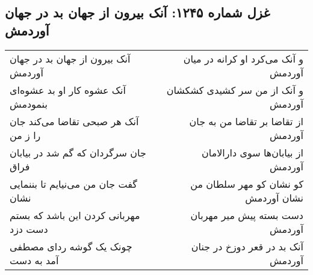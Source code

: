 \begin{center}
\section*{غزل شماره ۱۲۴۵: آنک بیرون از جهان بد در جهان آوردمش}
\label{sec:1245}
\begin{longtable}{l p{0.5cm} r}
آنک بیرون از جهان بد در جهان آوردمش
&&
و آنک می‌کرد او کرانه در میان آوردمش
\\
آنک عشوه کار او بد عشوه‌ای بنمودمش
&&
و آنک از من سر کشیدی کشکشان آوردمش
\\
آنک هر صبحی تقاضا می‌کند جان را ز من
&&
از تقاضا بر تقاضا من به جان آوردمش
\\
جان سرگردان که گم شد در بیابان فراق
&&
از بیابان‌ها سوی دارالامان آوردمش
\\
گفت جان من می‌نیایم تا بننمایی نشان
&&
کو نشان کو مهر سلطان من نشان آوردمش
\\
مهربانی کردن این باشد که بستم دست دزد
&&
دست بسته پیش میر مهربان آوردمش
\\
چونک یک گوشه ردای مصطفی آمد به دست
&&
آنک بد در قعر دوزخ در جنان آوردمش
\\
\end{longtable}
\end{center}

